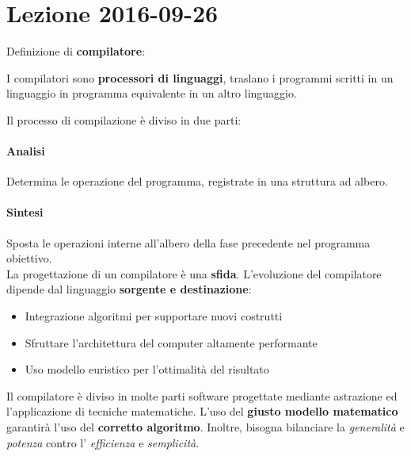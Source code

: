 \section{Lezione 2016-09-26}
Definizione di \textbf{compilatore}:

\begin{definition}
I compilatori sono \textbf{processori di linguaggi}, traslano i programmi
scritti in un linguaggio in programma equivalente in un altro linguaggio.
\end{definition}

Il processo di compilazione è diviso in due parti:
\paragraph{Analisi}
Determina le operazione del programma, registrate in una struttura ad albero.
\paragraph{Sintesi}
Sposta le operazioni interne all'albero della fase precedente nel programma
obiettivo. \\

La progettazione di un compilatore è una \textbf{sfida}. L'evoluzione del
compilatore dipende dal linguaggio \textbf{sorgente e destinazione}:
\begin{itemize}
\item Integrazione algoritmi per supportare nuovi costrutti
\item Sfruttare l'architettura del computer altamente performante
\item Uso modello euristico per l'ottimalità del risultato
\end{itemize}

Il compilatore è diviso in molte parti software progettate mediante astrazione
ed l'applicazione di tecniche matematiche. L'uso del \textbf{giusto modello
matematico} garantirà l'uso del \textbf{corretto algoritmo}. Inoltre, bisogna
bilanciare la \textit{generalità} e \textit{potenza} contro l'
\textit{efficienza} e \textit{semplicità}.
